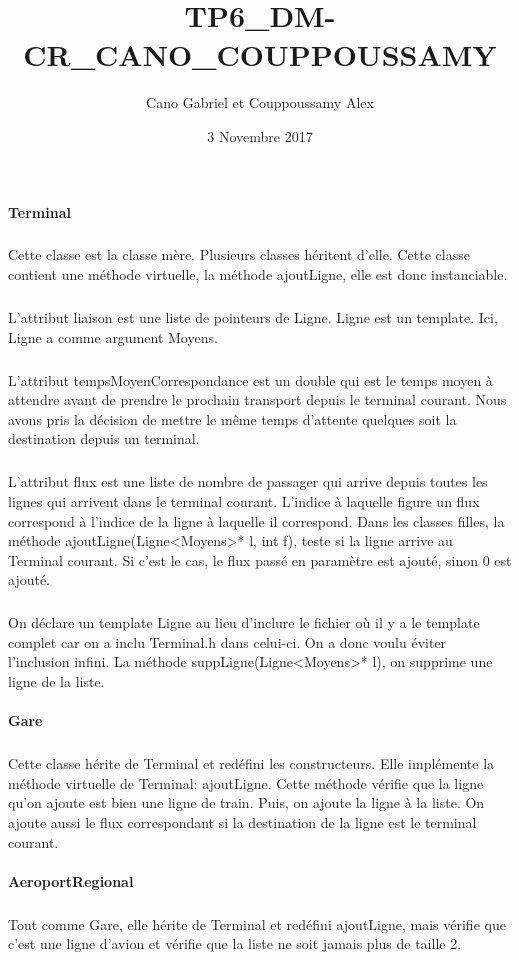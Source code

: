 \documentclass[a4paper]{article}
\title{TP6\_DM-CR\_CANO\_COUPPOUSSAMY}
\author{Cano Gabriel et Couppoussamy Alex}
\date{3 Novembre 2017}
\begin{document}
\maketitle
	\begin{justify}
		\paragraph{Terminal}
		\subparagraph{}Cette classe est la classe mère. Plusieurs classes héritent d’elle. Cette classe contient une méthode virtuelle, la méthode ajoutLigne, elle est donc instanciable.\newline
		\subparagraph{}L’attribut liaison est une liste de pointeurs de Ligne. Ligne est un template. Ici, Ligne a comme argument Moyens. \newline
		\subparagraph{}L’attribut tempsMoyenCorrespondance est un double qui est le temps moyen à attendre avant de prendre le prochain transport depuis le terminal courant. Nous avons pris la décision de mettre le même temps d’attente quelques soit la destination depuis un terminal.\newline
		\subparagraph{}L’attribut flux est une liste de nombre de passager qui arrive depuis toutes les lignes qui arrivent dans le terminal courant. L’indice à laquelle figure un flux correspond à l’indice de la ligne à laquelle il correspond. Dans les classes filles, la méthode ajoutLigne(Ligne<Moyens>* l, int f), teste si la ligne arrive au Terminal courant. Si c’est le cas, le flux passé en paramètre est ajouté, sinon 0 est ajouté.\newline
		\subparagraph{}On déclare un template Ligne au lieu d’inclure le fichier où il y a le template complet car on a inclu Terminal.h dans celui-ci. On a donc voulu éviter l’inclusion infini.\newline
La méthode suppLigne(Ligne<Moyens>* l), on supprime une ligne de la liste.
		\paragraph{Gare}
		\subparagraph{}Cette classe hérite de Terminal et redéfini les constructeurs. Elle implémente la méthode virtuelle de Terminal: ajoutLigne. Cette méthode vérifie que la ligne qu’on ajoute est bien une ligne de train. Puis, on ajoute la ligne à la liste. On ajoute aussi le flux correspondant si la destination de la ligne est le terminal courant.
		\paragraph{AeroportRegional}
		\subparagraph{}Tout comme Gare, elle hérite de Terminal et redéfini ajoutLigne, mais vérifie que c’est une ligne d’avion et vérifie que la liste ne soit jamais plus de taille 2.

\end{justify}
\end{document}
